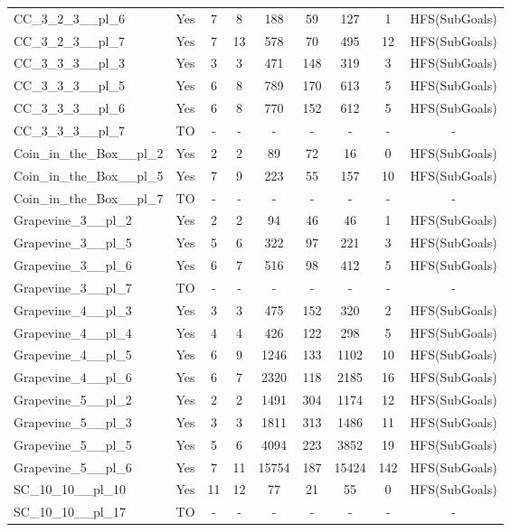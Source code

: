 \documentclass{article}
\begin{document}
\begin{tabular}{lcccccccc}
CC\_3\_2\_3\_\_pl\_6 & Yes & 7 & 8 & 188 & 59 & 127 & 1 & HFS(SubGoals) \\
CC\_3\_2\_3\_\_pl\_7 & Yes & 7 & 13 & 578 & 70 & 495 & 12 & HFS(SubGoals) \\
CC\_3\_3\_3\_\_pl\_3 & Yes & 3 & 3 & 471 & 148 & 319 & 3 & HFS(SubGoals) \\
CC\_3\_3\_3\_\_pl\_5 & Yes & 6 & 8 & 789 & 170 & 613 & 5 & HFS(SubGoals) \\
CC\_3\_3\_3\_\_pl\_6 & Yes & 6 & 8 & 770 & 152 & 612 & 5 & HFS(SubGoals) \\
CC\_3\_3\_3\_\_pl\_7 & TO & - & - & - & - & - & - & - \\
Coin\_in\_the\_Box\_\_pl\_2 & Yes & 2 & 2 & 89 & 72 & 16 & 0 & HFS(SubGoals) \\
Coin\_in\_the\_Box\_\_pl\_5 & Yes & 7 & 9 & 223 & 55 & 157 & 10 & HFS(SubGoals) \\
Coin\_in\_the\_Box\_\_pl\_7 & TO & - & - & - & - & - & - & - \\
Grapevine\_3\_\_pl\_2 & Yes & 2 & 2 & 94 & 46 & 46 & 1 & HFS(SubGoals) \\
Grapevine\_3\_\_pl\_5 & Yes & 5 & 6 & 322 & 97 & 221 & 3 & HFS(SubGoals) \\
Grapevine\_3\_\_pl\_6 & Yes & 6 & 7 & 516 & 98 & 412 & 5 & HFS(SubGoals) \\
Grapevine\_3\_\_pl\_7 & TO & - & - & - & - & - & - & - \\
Grapevine\_4\_\_pl\_3 & Yes & 3 & 3 & 475 & 152 & 320 & 2 & HFS(SubGoals) \\
Grapevine\_4\_\_pl\_4 & Yes & 4 & 4 & 426 & 122 & 298 & 5 & HFS(SubGoals) \\
Grapevine\_4\_\_pl\_5 & Yes & 6 & 9 & 1246 & 133 & 1102 & 10 & HFS(SubGoals) \\
Grapevine\_4\_\_pl\_6 & Yes & 6 & 7 & 2320 & 118 & 2185 & 16 & HFS(SubGoals) \\
Grapevine\_5\_\_pl\_2 & Yes & 2 & 2 & 1491 & 304 & 1174 & 12 & HFS(SubGoals) \\
Grapevine\_5\_\_pl\_3 & Yes & 3 & 3 & 1811 & 313 & 1486 & 11 & HFS(SubGoals) \\
Grapevine\_5\_\_pl\_5 & Yes & 5 & 6 & 4094 & 223 & 3852 & 19 & HFS(SubGoals) \\
Grapevine\_5\_\_pl\_6 & Yes & 7 & 11 & 15754 & 187 & 15424 & 142 & HFS(SubGoals) \\
SC\_10\_10\_\_pl\_10 & Yes & 11 & 12 & 77 & 21 & 55 & 0 & HFS(SubGoals) \\
SC\_10\_10\_\_pl\_17 & TO & - & - & - & - & - & - & - \\

\end{tabular}
\end{document}
